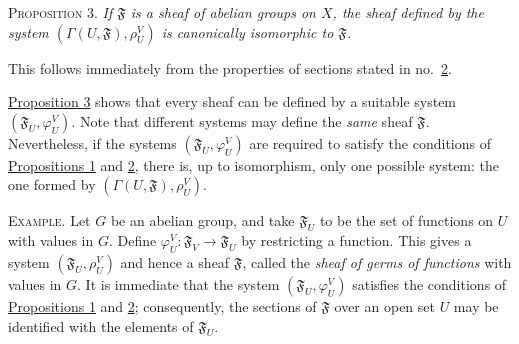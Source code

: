 \medskip
{}\label{fac:I:1:no:3:prop:3}
\textsc{Proposition 3.} \textit{If $\mathfrak{F}$ is a sheaf of abelian groups on $X$, the sheaf defined by the system $(\Gamma(U,\mathfrak{F}),\rho_U^V)$ is canonically isomorphic to $\mathfrak{F}$.}

This follows immediately from the properties of sections stated in no.~\hyperref[fac:I:1:no:2]{2}.

\hyperref[fac:I:1:no:3:prop:3]{Proposition 3} shows that every sheaf can be defined by a suitable system $(\mathfrak{F}_U,\varphi_U^V)$. Note that different systems may define the \textit{same} sheaf $\mathfrak{F}$. Nevertheless, if the systems $(\mathfrak{F}_U,\varphi_U^V)$ are required to satisfy the conditions of \hyperref[fac:I:1:no:3:prop:1]{Propositions 1} and \hyperref[fac:I:1:no:3:prop:2]{2}, there is, up to isomorphism, only one possible system: the one formed by $(\Gamma(U,\mathfrak{F}),\rho_U^V)$.

\textsc{Example.} Let $G$ be an abelian group, and take $\mathfrak{F}_U$ to be the set of functions on $U$ with values in $G$. Define $\varphi_U^V:\mathfrak{F}_V\to\mathfrak{F}_U$ by restricting a function. This gives a system $(\mathfrak{F}_U,\rho_U^V)$ and hence a sheaf $\mathfrak{F}$, called the \textit{sheaf of germs of functions} with values in $G$. It is immediate that the system $(\mathfrak{F}_U,\varphi_U^V)$ satisfies the conditions of \hyperref[fac:I:1:no:3:prop:1]{Propositions 1} and \hyperref[fac:I:1:no:3:prop:2]{2}; consequently, the sections of $\mathfrak{F}$ over an open set $U$ may be identified with the elements of $\mathfrak{F}_U$.
